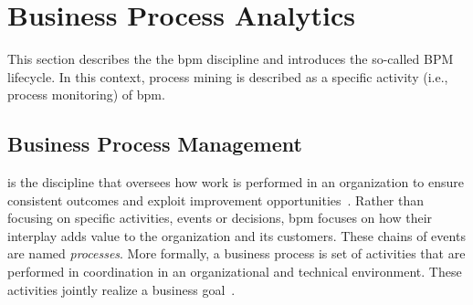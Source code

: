 





\section{Business Process Analytics}
\label{sec:bpa}

This section describes the the \gls{bpm} discipline and introduces the so-called BPM lifecycle. In this context, process mining is described as a specific activity (i.e., process monitoring) of \gls{bpm}.

\subsection{Business Process Management}
\label{sec:business-process}

 is the discipline that oversees how work is performed in an organization to ensure consistent outcomes and exploit improvement opportunities~\citep{Dumas2018}. Rather than focusing on specific activities, events or decisions, \gls{bpm} focuses on how their interplay adds value to the organization and its customers. These chains of events are named \emph{processes}. More formally, a business process is set of activities that are performed in coordination in an organizational and technical
environment. These activities jointly realize a business goal~\citep{DBLP:books/sp/Weske19}.

